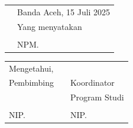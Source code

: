 \vspace{0.4cm}
{\renewcommand{\arraystretch}{0.8}
\begin{tabular}{p{7.5cm}l}
	&Banda Aceh, 15 Juli 2025 \\
	[-0.1cm]
	&Yang menyatakan \\
	[1.5cm]
	&\underline{\@fullname}\\
	&NPM. \@idnum 
\end{tabular}

\centering
\begin{tabular}{lll}
	Mengetahui, && \\
	[-0.1cm]
	Pembimbing &&Koordinator\\
	&&Program Studi \\
	[1.5cm]
	\underline{\@firstsupervisor}&&\underline{\@kaprodi}\\
	NIP. \@firstnip&&NIP. \@kaprodinip
\end{tabular}
}



\makeatother
